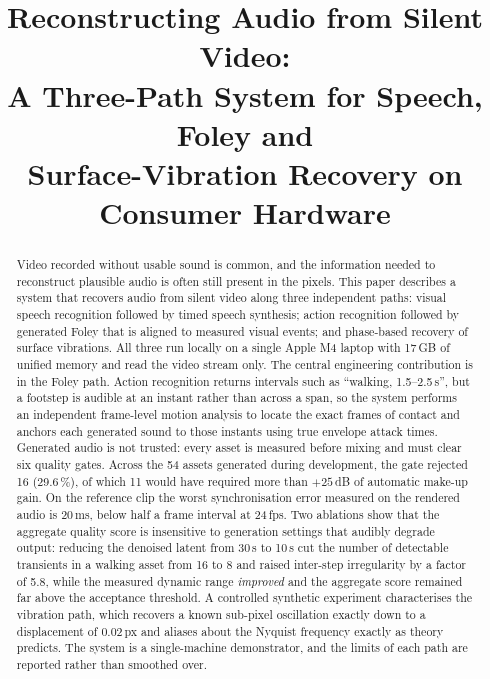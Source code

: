 \documentclass[conference]{IEEEtran}
\begin{document}
\title{Reconstructing Audio from Silent Video:\\
A Three-Path System for Speech, Foley and\\
Surface-Vibration Recovery on Consumer Hardware}

\author{
}

\maketitle

\begin{abstract}
Video recorded without usable sound is common, and the information needed to
reconstruct plausible audio is often still present in the pixels. This paper
describes a system that recovers audio from silent video along three independent
paths: visual speech recognition followed by timed speech synthesis; action
recognition followed by generated Foley that is aligned to measured visual
events; and phase-based recovery of surface vibrations. All three run locally on
a single Apple M4 laptop with 17\,GB of unified memory and read the video stream
only. The central engineering contribution is in the Foley path. Action
recognition returns intervals such as ``walking, 1.5--2.5\,s'', but a footstep is
audible at an instant rather than across a span, so the system performs an
independent frame-level motion analysis to locate the exact frames of contact and
anchors each generated sound to those instants using true envelope attack times.
Generated audio is not trusted: every asset is measured before mixing and must
clear six quality gates. Across the 54 assets generated during development, the
gate rejected 16 (29.6\,\%), of which 11 would have required more than
$+25$\,dB of automatic make-up gain. On the reference clip the worst
synchronisation error measured on the rendered audio is 20\,ms, below half a
frame interval at 24\,fps. Two ablations show that the aggregate quality score is
insensitive to generation settings that audibly degrade output: reducing the
denoised latent from 30\,s to 10\,s cut the number of detectable transients in a
walking asset from 16 to 8 and raised inter-step irregularity by a factor of 5.8,
while the measured dynamic range \emph{improved} and the aggregate score remained
far above the acceptance threshold. A controlled synthetic experiment characterises the vibration path,
which recovers a known sub-pixel oscillation exactly down to a displacement of
0.02\,px and aliases about the Nyquist frequency exactly as theory predicts. The
system is a single-machine demonstrator, and the limits of each path are reported
rather than smoothed over.
\end{abstract}
\end{document}
